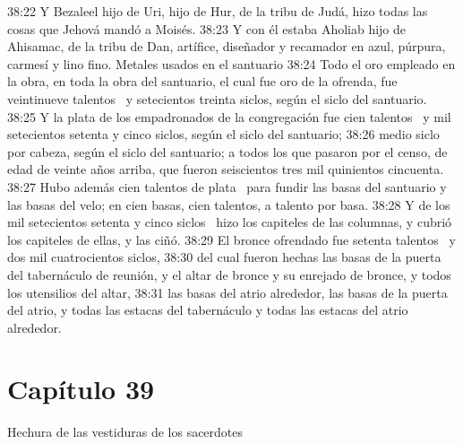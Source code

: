 38:22 Y Bezaleel hijo de Uri, hijo de Hur, de la tribu de Judá, hizo todas las cosas que Jehová mandó a Moisés. 
38:23 Y con él estaba Aholiab hijo de Ahisamac, de la tribu de Dan, artífice, diseñador y recamador en azul, púrpura, carmesí y lino fino. 
Metales usados en el santuario 
38:24 Todo el oro empleado en la obra, en toda la obra del santuario, el cual fue oro de la ofrenda, fue veintinueve talentos  y setecientos treinta siclos, según el siclo del santuario. 
38:25 Y la plata de los empadronados de la congregación fue cien talentos  y mil setecientos setenta y cinco siclos, según el siclo del santuario; 
38:26 medio siclo por cabeza, según el siclo del santuario; a todos los que pasaron por el censo, de edad de veinte años arriba, que fueron seiscientos tres mil quinientos cincuenta.  
38:27 Hubo además cien talentos de plata  para fundir las basas del santuario y las basas del velo; en cien basas, cien talentos, a talento por basa. 
38:28 Y de los mil setecientos setenta y cinco siclos  hizo los capiteles de las columnas, y cubrió los capiteles de ellas, y las ciñó. 
38:29 El bronce ofrendado fue setenta talentos  y dos mil cuatrocientos siclos, 
38:30 del cual fueron hechas las basas de la puerta del tabernáculo de reunión, y el altar de bronce y su enrejado de bronce, y todos los utensilios del altar, 
38:31 las basas del atrio alrededor, las basas de la puerta del atrio, y todas las estacas del tabernáculo y todas las estacas del atrio alrededor. 
\section*{Capítulo 39}
Hechura de las vestiduras de los sacerdotes  

